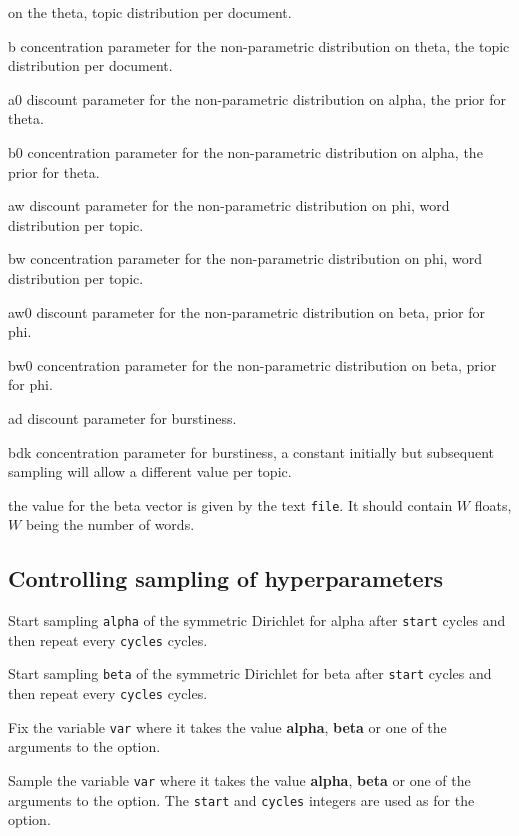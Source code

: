 \documentclass[a4paper,english]{article}
\begin{document}
\begin{Description}
\begin{Description}[bdk]
  on the theta, topic distribution per document.
\item[b] concentration parameter for the non-parametric distribution
  on theta, the topic distribution per document.
\item[a0] discount parameter for the non-parametric distribution
  on alpha, the prior for theta.
\item[b0] concentration parameter for the non-parametric distribution
  on alpha, the prior for theta.
\item[aw] discount parameter for the non-parametric distribution
  on phi, word distribution per topic.
\item[bw] concentration parameter for the non-parametric distribution
  on phi, word distribution per topic.
\item[aw0] discount parameter for the non-parametric distribution
  on beta, prior for phi.
\item[bw0] concentration parameter for the non-parametric distribution
  on beta, prior for phi.
\item[ad] discount parameter for burstiness.
\item[bdk] concentration parameter for burstiness, a constant initially
     but subsequent sampling will allow a different value per topic.
\end{Description}
\item[\OptArg{-u}{file}] 
the value for the beta vector is given by the text \texttt{file}.
It should contain $W$ floats, $W$ being the number of words.
\end{Description}

\subsection{Controlling sampling of hyperparameters}
\begin{Description}\setlength{\itemsep}{0cm}
\item[\OptArg{-D}{cycles,start}] 
Start sampling \texttt{alpha} of the symmetric Dirichlet for alpha after
\texttt{start} cycles and then repeat every \texttt{cycles} cycles.
\item[\OptArg{-E}{cycles,start}] 
Start sampling \texttt{beta} of the symmetric Dirichlet for beta after
\texttt{start} cycles and then repeat every \texttt{cycles} cycles.
\item[\OptArg{-F}{var}]
Fix the variable \texttt{var} where
it takes the value \textbf{alpha}, \textbf{beta} or one of the
arguments to the  option.
\item[\OptArg{-G}{var,cycles,start}]
Sample the variable \texttt{var} where
it takes the value \textbf{alpha}, \textbf{beta} or one of the
arguments to the  option.
The \texttt{start} and \texttt{cycles} integers are used as for
the  option.
\end{Description}
\end{document}

